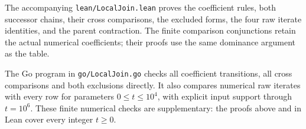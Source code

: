 \documentclass[11pt,letterpaper]{article}
\begin{document}
The accompanying \texttt{lean/LocalJoin.lean} proves the coefficient rules,
both successor chains, their cross comparisons, the excluded forms,
the four raw iterate identities, and the parent contraction.
The finite comparison conjunctions retain the actual numerical coefficients;
their proofs use the same dominance argument as the table.

The Go program in \texttt{go/LocalJoin.go} checks all coefficient transitions,
all cross comparisons and both exclusions directly.
It also compares numerical raw iterates with every row for parameters
\(0\le t\le10^4\), with explicit input support through \(t=10^6\).
These finite numerical checks are supplementary:
the proofs above and in Lean cover every integer \(t\ge0\).
\end{document}
